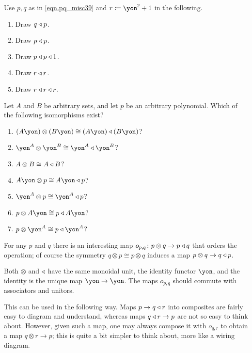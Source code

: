\documentclass[DynamicalBook]{subfiles}
\begin{document}
\begin{exercise}
Use $p,q$ as in \cref{eqn.pq_misc39} and $r\coloneqq \yon^\2+\1$ in the following.
\begin{enumerate}
	\item Draw $q\mathbin{\triangleleft} p$.
	\item Draw $p\mathbin{\triangleleft} p$.
	\item Draw $p\mathbin{\triangleleft} p\mathbin{\triangleleft} 1$.
	\item Draw $r\mathbin{\triangleleft} r$.
	\item Draw $r\mathbin{\triangleleft} r\mathbin{\triangleleft} r$.
\qedhere
\end{enumerate}
\end{exercise}

\begin{exercise}
Let $A$ and $B$ be arbitrary sets, and let $p$ be an arbitrary polynomial. Which of the following isomorphisms exist?
\begin{enumerate}
	\item $(A\yon)\otimes(B\yon) \cong (A\yon)\tri (B\yon)$?
	\item $\yon^A\otimes\yon^B\cong\yon^A\tri\yon^B$?
	\item $A\otimes B\cong A\mathbin{\triangleleft} B$?
	\item $A\yon\otimes p\cong A\yon\tri p$?
	\item $\yon^A\otimes p\cong \yon^A\tri p$?
	\item $p\otimes A\yon\cong p\tri A\yon$?
	\item $p\otimes \yon^A\cong p\tri\yon^A$?
\qedhere
\end{enumerate}
\end{exercise}

\begin{example}
For any $p$ and $q$ there is an interesting map $o_{p,q}\colon p\otimes q\to p\mathbin{\triangleleft} q$ that orders the operation; of course the symmetry $q\otimes p\cong p\otimes q$ induces a map $p\otimes q\to q\mathbin{\triangleleft} p$.

Both $\otimes$ and $\mathbin{\triangleleft}$ have the same monoidal unit, the identity functor $\yon$, and the identity is the unique map $\yon\to\yon$. The maps $o_{p,q}$ should commute with associators and unitors. 

This can be used in the following way. Maps $p\to q\mathbin{\triangleleft} r$ into composites are fairly easy to diagram and understand, whereas maps $q\mathbin{\triangleleft} r\to p$ are not so easy to think about. However, given such a map, one may always compose it with $o_{q,r}$ to obtain a map $q\otimes r\to p$; this is quite a bit simpler to think about, more like a wiring diagram.
\end{example}
\end{document}
